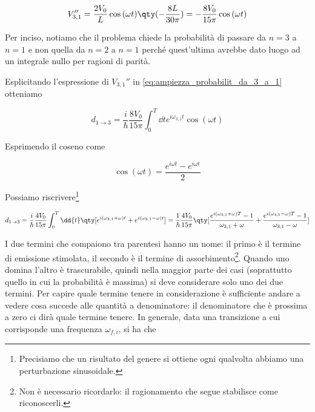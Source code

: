 \begin{soluzione}
   \begin{equation*}
      V''_{3,1}
      =\frac{2V_0}{L} \cos{(\omega t)} \qty( - \frac{8 L}{30 \pi} )
      =-\frac{8 V_0}{15 \pi} \cos{(\omega t)}
   \end{equation*}

   Per inciso, notiamo che il problema chiede la probabilità di passare da $n=3$ a $n=1$ e non quella da $n=2$ a $n=1$ perché quest'ultima avrebbe dato luogo ad un integrale nullo per ragioni di parità.

   Esplicitando l'espressione di $V_{3,1}''$ in \eqref{eq:ampiezza_probabilit_da_3_a_1} otteniamo

   \begin{equation*}
      d_{1 \to 3}
      =\frac{i}{\hbar} \frac{8 V_0}{15 \pi} \int_{0}^{T} \dd{t} e^{i \omega_{3,1} t} \cos{(\omega t)}
   \end{equation*}

   Esprimendo il coseno come

   \begin{equation*}
      \cos{(\omega t)}
      =\frac{e^{i\omega t} - e^{i\omega t}}{2}
   \end{equation*}
   
   Possiamo riscrivere\footnote{Precisiamo che un risultato del genere si ottiene ogni qualvolta abbiamo una perturbazione sinusoidale.}

   \begin{equation*}
      d_{1 \to 3}
      =\frac{i}{\hbar} \frac{4 V_0}{15 \pi} \int_{0}^{T} \dd{t} \qty[ e^{i ( \omega_{3,1} + \omega) t} + e^{i ( \omega_{3,1} - \omega) t} ]
      =\frac{1}{\hbar} \frac{4 V_0}{15 \pi} \qty[ \frac{e^{i ( \omega_{3,1} + \omega ) T} - 1}{ \omega_{3,1} + \omega } + \frac{e^{i ( \omega_{3,1} - \omega ) T} - 1}{ \omega_{3,1} - \omega } ]
   \end{equation*}

   I due termini che compaiono tra parentesi hanno un nome: il primo è il termine di emissione stimolata, il secondo è il termine di assorbimento\footnote{Non è necessario ricordarlo: il ragionamento che segue stabilisce come riconoscerli.}. Quando uno domina l'altro è trascurabile, quindi nella maggior parte dei casi (soprattutto quello in cui la probabilità è massima) si deve considerare solo uno dei due termini. Per capire quale termine tenere in considerazione è sufficiente andare a vedere cosa succede alle quantità a denominatore: il denominatore che è prossima a zero ci dirà quale termine tenere. In generale, data una transizione a cui corrisponde una frequenza $\omega_{f,i}$, si ha che


\end{soluzione}
